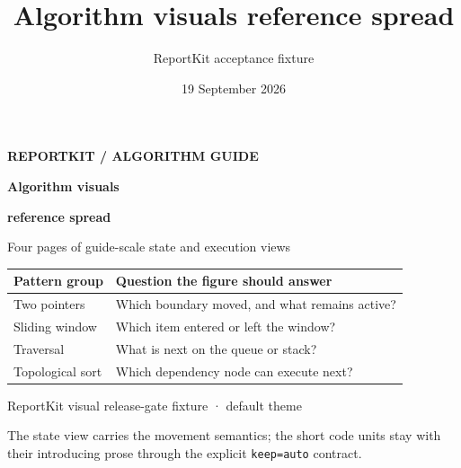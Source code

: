 \documentclass{reportkit}
\title{Algorithm visuals reference spread}
\author{ReportKit acceptance fixture}
\date{19 September 2026}
\begin{document}
\RKFrontMatterBegin

\thispagestyle{empty}
\begin{center}
  \vspace*{0.08\textheight}
  {\sffamily\fontsize{8.5}{10}\selectfont\bfseries\color{LinkBlue}
    REPORTKIT / ALGORITHM GUIDE\par}
  \vspace{7mm}
  {\sffamily\bfseries\fontsize{23}{27}\selectfont\color{Ink}
    Algorithm visuals\par}
  {\sffamily\bfseries\fontsize{23}{27}\selectfont\color{Ink}
    reference spread\par}
  \vspace{4mm}
  {\sffamily\color{Muted}Four pages of guide-scale state and execution views\par}
  \vspace{7mm}
  {\sffamily\fontsize{8}{10}\selectfont\color{Muted}
    \par}
  \vspace{9mm}
  \begingroup
  \sffamily\fontsize{8.2}{10}\selectfont
  \renewcommand{\arraystretch}{1.35}
  \begin{tabular}{@{}p{}p{}@{}}
    \toprule
    \textbf{Pattern group} & \textbf{Question the figure should answer} \\
    \midrule
    Two pointers & Which boundary moved, and what remains active? \\
    Sliding window & Which item entered or left the window? \\
    Traversal & What is next on the queue or stack? \\
    Topological sort & Which dependency node can execute next? \\
    \bottomrule
  \end{tabular}
  \endgroup
  \vfill
  {\sffamily\fontsize{8}{10}\selectfont\color{Muted}
    ReportKit visual release-gate fixture · default theme\par}
\end{center}
\clearpage
\RKMainMatterBegin

The state view carries the movement semantics; the short code units stay with
their introducing prose through the explicit \texttt{keep=auto} contract.
\end{document}
